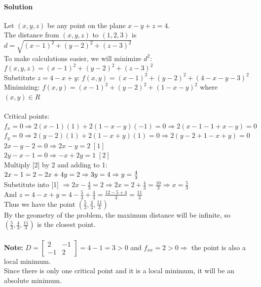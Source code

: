 \documentclass{article}
\newcommand{\mat}[4]{\begin{bmatrix} #1 & #2 \\ #3 & #4 \end{bmatrix}}
\begin{document}
\paragraph{Solution} Let $(x,y,z)$ be any point on the plane $x-y+z=4$.
\\The distance from $(x,y,z)$ to $(1,2,3)$ is $d=\sqrt{(x-1)^2+(y-2)^2+(z-3)^2}$
\\To make calculations easier, we will minimize $d^2:$
\\$f(x,y,z)=(x-1)^2+(y-2)^2+(z-3)^2$
\\Substitute $z=4-x+y$: $f(x,y)=(x-1)^2+(y-2)^2+(4-x-y-3)^2$
\\Minimizing: $f(x,y)=(x-1)^2+(y-2)^2+(1-x-y)^2$ where $(x,y)\in R$
\\\\Critical points: $f_x=0\Rightarrow 2(x-1)(1)+2(1-x-y)(-1)=0\Rightarrow 2(x-1-1+x-y)=0$
\\$f_y=0\Rightarrow 2(y-2)(1)+2(1-x+y)(1)=0\Rightarrow 2(y-2+1-x+y)=0$
\\$2x-y-2=0\Rightarrow 2x-y=2\;[1]$
\\$2y-x-1=0\Rightarrow -x+2y=1\;[2]$
\\Multiply [2] by 2 and adding to 1:
\\$2x-1=2
\\-2x+4y=2
\\\Rightarrow 3y=4\Rightarrow y=\frac{4}{3}$
\\Substitute into [1] $\Rightarrow 2x-\frac{4}{3}=2\Rightarrow2x=2+\frac{4}{3}=\frac{10}{3}\Rightarrow x=\frac{5}{3}$
\\And $z=4-x+y=4-\frac{5}{3}+\frac{4}{3}=\frac{12-5+4}{3}=\frac{11}{3}$
\\Thus we have the point $(\frac{5}{3},\frac{4}{3},\frac{11}{3})$
\\By the geometry of the problem, the maximum distance will be infinite, so $(\frac{5}{3},\frac{4}{3},\frac{11}{3})$ is the closest point.
\\\\\textbf{Note:} $D=\mat{2}{-1}{-1}{2}=4-1=3>0$ and $f_{xx}=2>0\Rightarrow$ the point is also a local minimum.
\\Since there is only one critical point and it is a local minimum, it will be an absolute minimum.
\end{document}
